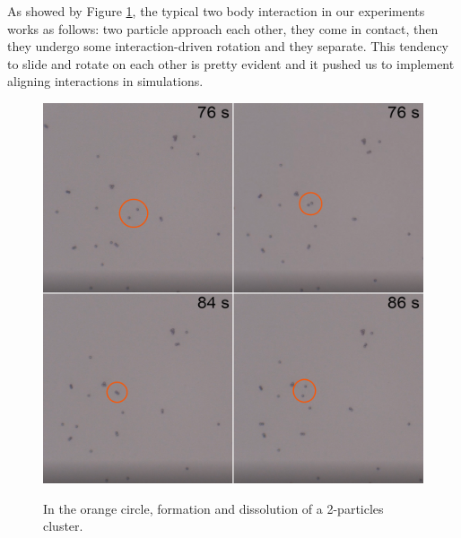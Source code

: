 \documentclass[../../master_thesis_np.tex]{subfiles}
\begin{document}
	As showed by Figure \ref{fig:doub9}, the typical two body interaction in our experiments works as follows: two particle approach each other, they come in contact, then they undergo some interaction-driven rotation and they separate.
	This tendency to slide and rotate on each other is pretty evident and it pushed us to implement aligning interactions in simulations.
	\begin{figure}[hbtp]
		\centering
		\includegraphics[width = \textwidth]{qual/doub9.png}
		\label{fig:doub9}
		\caption{In the orange circle, formation and dissolution of a 2-particles cluster.}
	\end{figure}
	
\end{document}
